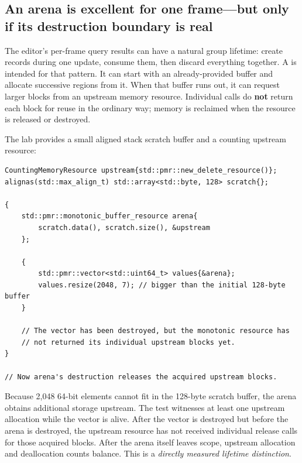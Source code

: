 \subsection{An arena is excellent for one frame---but only if its destruction boundary is real}\label{05-engine-i-ch006-an-arena-is-excellent-for-one-framebut-only-if-its-destruction-boundary-is-real}

\hypertarget{05-engine-i-ch006-an-arena-is-excellent-for-one-framebut-only-if-its-destruction-boundary-is-real}{}

The editor's per-frame query results can have a natural group lifetime: create records during one update, consume them, then discard everything together. A  is intended for that pattern. It can start with an already-provided buffer and allocate successive regions from it. When that buffer runs out, it can request larger blocks from an upstream memory resource. Individual  calls do \textbf{not} return each block for reuse in the ordinary way; memory is reclaimed when the resource is released or destroyed.

The lab provides a small aligned stack scratch buffer and a counting upstream resource:

\begin{verbatim}
CountingMemoryResource upstream{std::pmr::new_delete_resource()};
alignas(std::max_align_t) std::array<std::byte, 128> scratch{};

{
    std::pmr::monotonic_buffer_resource arena{
        scratch.data(), scratch.size(), &upstream
    };

    {
        std::pmr::vector<std::uint64_t> values{&arena};
        values.resize(2048, 7); // bigger than the initial 128-byte buffer
    }

    // The vector has been destroyed, but the monotonic resource has
    // not returned its individual upstream blocks yet.
}

// Now arena's destruction releases the acquired upstream blocks.
\end{verbatim}

Because 2,048 64-bit elements cannot fit in the 128-byte scratch buffer, the arena obtains additional storage upstream. The test witnesses at least one upstream allocation while the vector is alive. After the vector is destroyed but before the arena is destroyed, the upstream resource has not received individual release calls for those acquired blocks. After the arena itself leaves scope, upstream allocation and deallocation counts balance. This is a \emph{directly measured lifetime distinction}.

